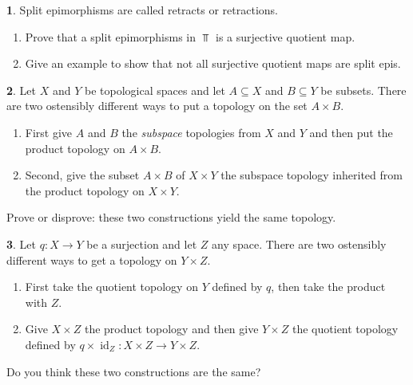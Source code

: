 \documentclass[11pt]{article}
\theoremstyle{definition}
\newtheorem{problem}{}
\newcommand{\bp}{\begin{problem}}
\newcommand{\ep}{\end{problem}\bigskip}
\theoremstyle{theorem}
\DeclareMathOperator{\id}{id}
\begin{document}
\bp Split epimorphisms are called retracts or retractions.  
\begin{enumerate}[label=(\alph*)]
\item Prove that a split epimorphisms in $\Top$ is a surjective quotient map.
\item Give an example to show that not all surjective quotient maps are split epis.
\end{enumerate}
\ep


\begin{problem} Let $X$ and $Y$ be topological spaces and let $A\subseteq X$ and $B\subseteq Y$ be subsets.  There are two ostensibly different ways to put a topology on the set $A\times B$.

\begin{enumerate}[label=(\alph*)]
\item First give $A$ and $B$ the \emph{subspace} topologies from $X$ and $Y$ and then put the product topology on $A\times B$. 
\item Second, give the subset $A\times B$ of $X\times Y$ the subspace topology inherited from the product topology on $X\times Y$.
\end{enumerate}
Prove or disprove:  these two constructions yield the same topology.
\end{problem}

\begin{problem}Let $q:X\to Y$ be a surjection and let $Z$ any space.  There are two ostensibly different ways to get a topology on $Y\times Z$.  
\begin{enumerate}[label=(\alph*)]
\item First take the quotient topology on $Y$ defined by $q$, then take the product with $Z$.
\item Give $X\times Z$ the product topology and then give $Y\times Z$ the quotient topology defined by $q\times \id_Z:X \times Z \to Y \times Z.$
\end{enumerate}

Do you think these two constructions are the same?
\end{problem}
\end{document}
